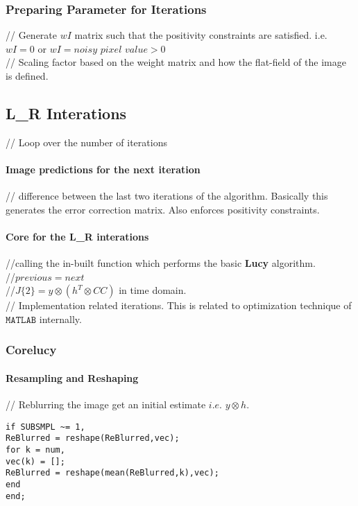\documentclass[a4paper]{book}
\begin{document}
\subsubsection{Preparing Parameter for Iterations}
// Generate $ wI $ matrix such that the positivity constraints are satisfied. i.e. $ wI = 0$ or $ wI = noisy$ $pixel$ $ value > 0 $\\
// Scaling factor based on the weight matrix and how the flat-field of the image is defined.
\subsection{L\_R Interations}
// Loop over the number of iterations
\paragraph{Image predictions for the next iteration}
// difference between the last two iterations of the algorithm. Basically this generates the error correction matrix. Also enforces positivity constraints.
\paragraph{Core for the L\_R interations}
//calling the in-built function which performs the basic \textbf{Lucy} algorithm.\\
 //$ previous = next $\\
 //$ J\{2\} = y \otimes \left(h^T \otimes CC\right)$ in time domain.\\
 // Implementation related iterations. This is related to optimization technique of $ \mathtt{MATLAB} $ internally.
\subsubsection{Corelucy}
\paragraph{Resampling and Reshaping}
 // Reblurring the image get an initial estimate $i.e.$ $ y\otimes h $.
\begin{lstlisting}
if SUBSMPL ~= 1,
ReBlurred = reshape(ReBlurred,vec);
for k = num,
vec(k) = [];
ReBlurred = reshape(mean(ReBlurred,k),vec);
end
end;
\end{lstlisting}
\end{document}
